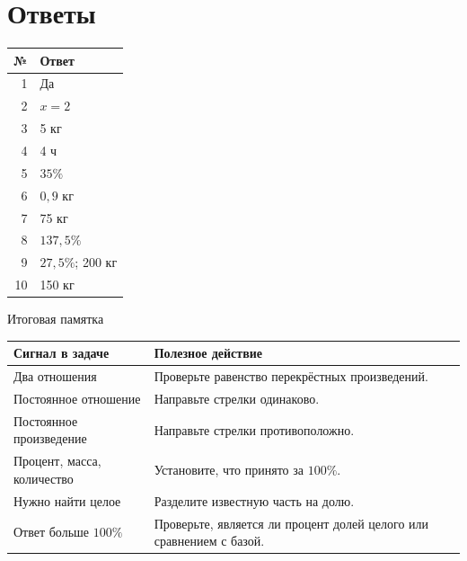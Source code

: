 \documentclass[a4paper,12pt]{article}
\begin{document}
\section*{Ответы}
\begin{center}
\begin{tabularx}{.94\linewidth}{@{}rX@{}}
\toprule № & Ответ\\\midrule
1 & Да\\
2 & $x=2$\\
3 & 5 кг\\
4 & 4 ч\\
5 & $35\%$\\
6 & $0{,}9$ кг\\
7 & 75 кг\\
8 & $137{,}5\%$\\
9 & $27{,}5\%$; 200 кг\\
10 & 150 кг\\\bottomrule
\end{tabularx}
\end{center}
\vspace{9mm}
\begin{center}{\large\color{darkaccent} Итоговая памятка}\end{center}
\begin{tabularx}{\linewidth}{@{}>{\raggedright\arraybackslash}p{.38\linewidth}X@{}}
\toprule Сигнал в задаче & Полезное действие\\\midrule
Два отношения & Проверьте равенство перекрёстных произведений.\\
Постоянное отношение & Направьте стрелки одинаково.\\
Постоянное произведение & Направьте стрелки противоположно.\\
Процент, масса, количество & Установите, что принято за $100\%$.\\
Нужно найти целое & Разделите известную часть на долю.\\
Ответ больше $100\%$ & Проверьте, является ли процент долей целого или сравнением с базой.\\\bottomrule
\end{tabularx}
\end{document}
